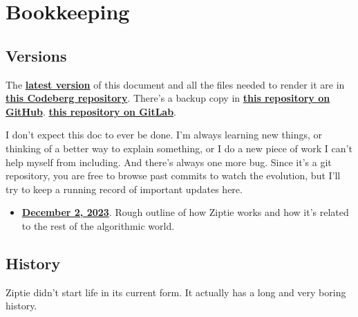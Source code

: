 \section{Bookkeeping}
\label{sec:bookkeeping}

\subsection{Versions}
\label{subsec:versions}

The \textbf{\href{
https://codeberg.org/brohrer/ziptie-paper/src/branch/main/ziptie.pdf}
{latest version}}
of this document and all the files needed to
render it are in \textbf{\href{
https://codeberg.org/brohrer/ziptie-paper}
{this Codeberg repository}}. There's a backup copy in \textbf{
\href{https://github.com/brohrer/ziptie-paper}
{this repository on GitHub}}.
 \textbf{
\href{https://gitlab.com/brohrer/ziptie-paper}
{this repository on GitLab}}.

I don't expect this doc to ever be done. I'm always learning new things,
or thinking of a better way to explain something, or I do a new
piece of work I can't help myself from including. And there's always
one more bug.
Since it's a git repository, you are free to browse past commits to watch
the evolution, but I'll try to keep a running record of important updates
here.

\begin{itemize}
\item{\textbf{\href{
https://codeberg.org/brohrer/ziptie-paper/src/tag/2023-12-02/ziptie.pdf}
{December 2, 2023}}. Rough outline of how Ziptie works
and how it's related to the rest of the algorithmic world.}
\end{itemize}

\subsection{History}
\label{subsec:history}

Ziptie didn't start life in its current form. It actually has a long
and very boring history.

